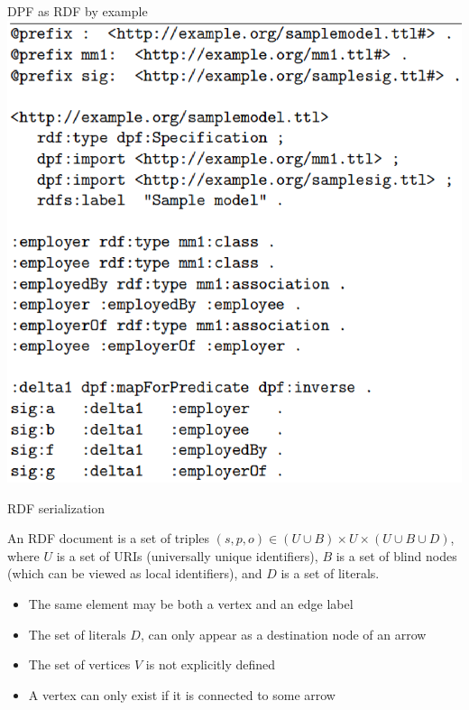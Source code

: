 \documentclass[dvips,slidetop,mathserif,brown]{beamer}
\begin{document}
\begin{frame}[t]{DPF as RDF by example}
{      \includegraphics[scale=0.4]{inst}
  }
\end{frame}


\begin{frame}{RDF serialization}
	\begin{block}{}
		An RDF document is a set of triples
		$(s,p,o)\in(U\cup B)\times U\times(U\cup B\cup D)$, where
		$U$ is a set of URIs (universally unique identifiers),
		$B$ is a set of blind nodes (which can be viewed as local identifiers),
		and $D$ is a set of literals.
	\end{block}
	\begin{itemize}
		\item The same element may be both a vertex and an edge label
		\item The set of literals $D$, can only appear
		as a destination node of an arrow
		\item The set of vertices $V$ is not explicitly defined
		\item A vertex can only exist if it is connected to some arrow
	\end{itemize}
\end{frame}
\end{document}
